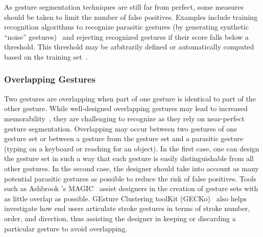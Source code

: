 As gesture segmentation techniques are still far from perfect, some measures should be taken to limit the number of false positives. Examples include training recognition algorithms to recognize parasitic gestures (\eg by generating synthetic ``noise'' gestures)~\cite{Taranta:2017} and rejecting recognized gestures if their score falls below a threshold. This threshold may be arbitrarily defined or automatically computed based on the training set~\cite{Caputo:2019}.


\subsubsection{Overlapping Gestures} \label{sec:state_of_the_art:overview:challenges:overlapping-gestures}
Two gestures are overlapping when part of one gesture is identical to part of the other gesture. While well-designed overlapping gestures may lead to increased memorability~\cite{Roy:2013}, they are challenging to recognize as they rely on near-perfect gesture segmentation. Overlapping may occur between two gestures of one gesture set or between a gesture from the gesture set and a parasitic gesture (\eg typing on a keyboard or reaching for an object). In the first case, one can design the gesture set in such a way that each gesture is easily distinguishable from all other gestures. In the second case, the designer should take into account as many potential parasitic gestures as possible to reduce the risk of false positives. Tools such as Ashbrook \etal's MAGIC~\cite{Ashbrook:2010} assist designers in the creation of gesture sets with as little overlap as possible. GEsture Clustering toolKit (GECKo)~\cite{Anthony:2013} also helps investigate how end users articulate stroke gestures in terms of stroke number, order, and direction, thus assisting the designer in keeping or discarding a particular gesture to avoid overlapping.





